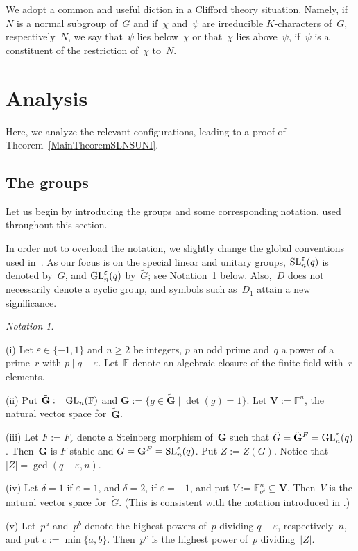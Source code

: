 \documentclass[12pt]{amsart}
\newcommand{\bG}{{\mathbf{G}}}      %
\newcommand{\bV}{{\mathbf{V}}}
\def\GL{ \text{\rm GL} }
\def\SL{ \text{\rm SL} }
\theoremstyle{theorem}
\theoremstyle{definition}
\theoremstyle{remark}
\newtheorem{notn}[thm]{Notation}
\begin{document}
We adopt a common and useful diction in a Clifford theory situation. Namely, 
if~$N$ is a normal subgroup of~$G$ and if~$\chi$ and~$\psi$ are irreducible
$K$-characters of~$G$, respectively~$N$, we say that~$\psi$ lies below~$\chi$
or that~$\chi$ lies above~$\psi$, if~$\psi$ is a constituent of the restriction
of~$\chi$ to~$N$.

\section{Analysis}\label{sec:Analysis}%
\label{TheSpecialLinearAndUnitaryGroups}

Here, we analyze the relevant configurations, leading to a proof of 
Theorem~\ref{MainTheoremSLNSUNI}.

\subsection{The groups}
\label{TheGroups}
Let us begin by introducing the groups and some corresponding notation,
used throughout this section.

In order not to overload the notation, we slightly change the global conventions
used in~\cite{HL25}. As our focus is on the special linear and unitary groups,
$\SL_n^{\varepsilon}(q)$ is denoted by~$G$, and $\GL_n^{\varepsilon}(q)$
by~$\tilde{G}$; see Notation~\ref{HypoI} below. Also,~$D$ does not necessarily 
denote a cyclic group, and symbols such as~$D_1$ attain a new significance.

\addtocounter{thm}{1}
\begin{notn}
\label{HypoI}
{\rm 
(i) Let $\varepsilon \in \{ -1, 1 \}$ and $n \geq 2$ be integers, $p$ an odd 
prime and~$q$ a power of a prime~$r$ with $p \mid q - \varepsilon$. 
Let~$\mathbb{F}$ denote an algebraic closure of the finite field with~$r$ 
elements. 

(ii) Put $\tilde{\bG} := \GL_n( \mathbb{F} )$ and $\bG :=
\{ g \in \tilde{\bG} \mid \det(g) = 1 \}$. Let $\bV := \mathbb{F}^n$, the 
natural vector space for~$\tilde{\bG}$.

(iii) Let $F := F_{\varepsilon}$ denote a Steinberg morphism of~$\tilde{\bG}$ such 
that $\tilde{G} = \tilde{\bG}^F = \GL_n^\varepsilon( q )$. Then~$\bG$ is 
$F$-stable and $G = \bG^F = \SL_n^\varepsilon( q )$. Put $Z := Z( G )$.
Notice that $|Z| = \gcd( q - \varepsilon, n )$.

(iv) Let $\delta = 1$ if $\varepsilon = 1$, and $\delta = 2$, if 
$\varepsilon = -1$, and put $V := \mathbb{F}_{q^\delta}^n \subseteq \bV$. 
Then~$V$ is the 
natural vector space for~$\tilde{G}$. (This is consistent with the notation 
introduced in \cite[Subsection~$3.1$]{HL25}.)

(v) Let~$p^a$ and~$p^b$ 
denote the highest powers of~$p$ dividing $q - \varepsilon$,
respectively~$n$, and put $c := \min\{a,b\}$. Then~$p^c$ is the highest
power of~$p$ dividing~$|Z|$.
}\hfill{\textsquare}
\end{notn}
\end{document}
